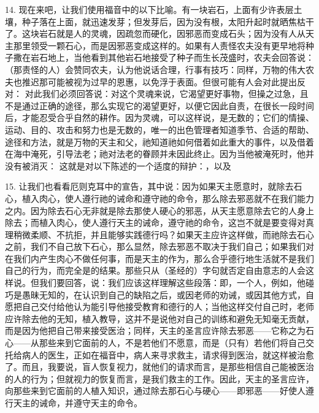 14. 现在来吧，让我们使用福音中的以下比喻。有一块岩石，上面有少许表层土壤，种子落在上面，就迅速发芽；但发芽后，因为没有根，太阳升起时就晒焦枯干了。这块岩石就是人的灵魂，因疏忽而硬化，因邪恶而变成石头；因为没有人从天主那里领受一颗石心，而是因邪恶变成这样的。如果有人责怪农夫没有更早地将种子撒在岩石地上，当他看到其他岩石地接受了种子而生长茂盛时，农夫会回答说： （那责怪的人）会赞同农夫，认为他说话合理，行事有技巧：同样，万物的伟大农夫也推迟那可能被视为过早的恩惠，以免浮于表面。但很可能有人会对此提出反对： 对此我们必须回答说：对这个灵魂来说，它渴望更好事物，但操之过急，且不是通过正确的途径，那么实现它的渴望更好，以便它因此自责，在很长一段时间后，才能忍受合乎自然的耕作。因为灵魂，可以这样说，是无数的；它们的情操、运动、目的、攻击和努力也是无数的，唯一的出色管理者知道季节、合适的帮助、途径和方法，就是万物的天主和父，祂知道祂如何借着如此重大的事件，以及借着在海中淹死，引导法老；祂对法老的眷顾并未因此终止。因为当他被淹死时，他并没有被消灭：  这就是对以下陈述的一个适度的辩护：，以及 \par

15. 让我们也看看厄则克耳中的宣告，其中说：因为如果天主愿意时，就除去石心，植入肉心，使人遵行祂的诫命和遵守祂的命令，那么除去邪恶就不在我们能力之内。因为除去石心无非就是除去那使人硬心的邪恶，从天主愿意除去它的人身上除去；而植入肉心，使人遵行天主的诫命，遵守祂的命令，这岂不就是要变得对真理稍微柔顺、不抗拒，并且能够实践德行吗？如果天主应许这样做，而祂除去石心之前，我们不自己放下石心，那么显然，除去邪恶不取决于我们自己；如果我们对在我们内产生肉心不做任何事，而是天主的作为，那么合乎德行地生活就不是我们自己的行为，而完全是的结果。那些只从（圣经的）字句就否定自由意志的人会这样说。但我们要回答，说：我们应该这样理解这些段落：即，一个人，例如，他碰巧是愚昧无知的，在认识到自己的缺陷之后，或因老师的劝诫，或因其他方式，自愿把自己交付给他认为能引导他接受教育和德行的人；当他这样交付自己时，老师应许除去他的无知，植入教导，这并不是说他对自己的训练和避免无知毫无贡献，而是因为他把自己带来接受医治；同样，天主的圣言应许除去邪恶——它称之为石心——从那些来到它面前的人，不是若他们不愿意，而是（只有）若他们将自己交托给病人的医生，正如在福音中，病人来寻求救主，请求得到医治，就这样被治愈了。而且，我要说，盲人恢复视力，就他们的请求而言，是那些相信自己能被医治的人的行为；但就视力的恢复而言，是我们救主的工作。因此，天主的圣言应许，向那些来到它面前的人植入知识，通过除去那石心与硬心——即邪恶——好使人遵行天主的诫命，并遵守天主的命令。\par

